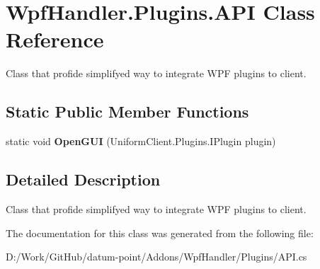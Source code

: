 \hypertarget{class_wpf_handler_1_1_plugins_1_1_a_p_i}{}\section{Wpf\+Handler.\+Plugins.\+A\+PI Class Reference}
\label{class_wpf_handler_1_1_plugins_1_1_a_p_i}


Class that profide simplifyed way to integrate W\+PF plugins to client.  


\subsection*{Static Public Member Functions}
\begin{DoxyCompactItemize}
\item 
\mbox{\label{class_wpf_handler_1_1_plugins_1_1_a_p_i_ab5fa2212cf7d00290d86c0aa5bc65f91}} 
static void {\bfseries Open\+G\+UI} (Uniform\+Client.\+Plugins.\+I\+Plugin plugin)
\end{DoxyCompactItemize}


\subsection{Detailed Description}
Class that profide simplifyed way to integrate W\+PF plugins to client. 



The documentation for this class was generated from the following file\+:\begin{DoxyCompactItemize}
\item 
D\+:/\+Work/\+Git\+Hub/datum-\/point/\+Addons/\+Wpf\+Handler/\+Plugins/A\+P\+I.\+cs\end{DoxyCompactItemize}
